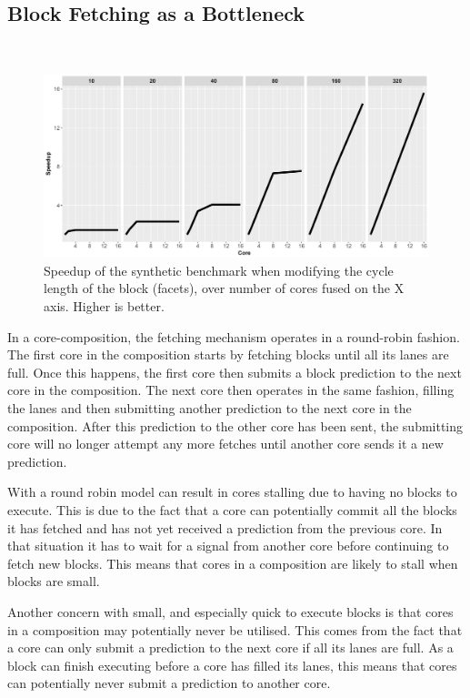 \subsection{Block Fetching as a Bottleneck}~\label{ch3:sec:bfn}

\begin{figure}[h]
    \centering
    \includegraphics[width=1\textwidth]{chapter3/graphics/motivation_standard_fetch.pdf}

    \caption{Speedup of the synthetic benchmark when modifying the cycle length of the block (facets), over number of cores fused on the X axis. Higher is better.}
    \label{fig:block_graph}
\end{figure}

In a core-composition, the fetching mechanism operates in a round-robin fashion.
The first core in the composition starts by fetching blocks until all its lanes are full.
Once this happens, the first core then submits a block prediction to the next core in the composition.
The next core then operates in the same fashion, filling the lanes and then submitting another prediction to the next core in the composition.
After this prediction to the other core has been sent, the submitting core will no longer attempt any more fetches until another core sends it a new prediction.

With a round robin model can result in cores stalling due to having no blocks to execute.
This is due to the fact that a core can potentially commit all the blocks it has fetched and has not yet received a prediction from the previous core.
In that situation it has to wait for a signal from another core before continuing to fetch new blocks.
This means that cores in a composition are likely to stall when blocks are small.

Another concern with small, and especially quick to execute blocks is that cores in a composition may potentially never be utilised.
This comes from the fact that a core can only submit a prediction to the next core if all its lanes are full.
As a block can finish executing before a core has filled its lanes, this means that cores can potentially never submit a prediction to another core.

